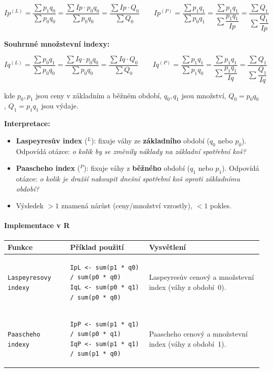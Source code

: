 \documentclass[a4paper, 11pt]{article}
\newenvironment{funkcedict}
{%
  \begingroup
  \renewcommand{\arraystretch}{1.4}%
  \lstset{basicstyle=\ttfamily\small, columns=fullflexible}%
  \setlength{\tabcolsep}{4pt}%
  \begin{tabular}{p{0.19\textwidth} p{0.38\textwidth} p{0.30\textwidth}}
  \textbf{Funkce} & \textbf{Příklad použití} & \textbf{Vysvětlení} \\
  \midrule
}
{%
  \end{tabular}%
  \endgroup
}
\begin{document}
\begin{equation*}
	Ip^{(L)} = \frac{\sum p_1 q_0}{\sum p_0 q_0}
	= \frac{\sum Ip \cdot p_0 q_0}{\sum p_0 q_0}
	= \frac{\sum Ip \cdot Q_0}{\sum Q_0}
	\qquad
	Ip^{(P)} = \frac{\sum p_1 q_1}{\sum p_0 q_1}
	= \frac{\sum p_1 q_1}{\sum \dfrac{p_1 q_1}{Ip}}
	= \frac{\sum Q_1}{\sum \dfrac{Q_1}{Ip}}
\end{equation*}

\medskip
\noindent\textbf{Souhrnné množstevní indexy:}

\begin{equation*}
	Iq^{(L)} = \frac{\sum p_0 q_1}{\sum p_0 q_0}
	= \frac{\sum Iq \cdot p_0 q_0}{\sum p_0 q_0}
	= \frac{\sum Iq \cdot Q_0}{\sum Q_0}
	\qquad
	Iq^{(P)} = \frac{\sum p_1 q_1}{\sum p_1 q_0}
	= \frac{\sum p_1 q_1}{\sum \dfrac{p_1 q_1}{Iq}}
	= \frac{\sum Q_1}{\sum \dfrac{Q_1}{Iq}}
\end{equation*}

kde $p_0, p_1$ jsou ceny v základním a běžném období, $q_0, q_1$ jsou množství,
$Q_0 = p_0 q_0$, $Q_1 = p_1 q_1$ jsou výdaje.

\medskip
\noindent\textbf{Interpretace:}
\begin{itemize}[noitemsep]
	\item \textbf{Laspeyresův index} (${}^L$): fixuje váhy ze \textbf{základního} období ($q_0$ nebo $p_0$). Odpovídá otázce: \emph{o kolik by se změnily náklady na základní spotřební koš?}
	\item \textbf{Paascheho index} (${}^P$): fixuje váhy z \textbf{běžného} období ($q_1$ nebo $p_1$). Odpovídá otázce: \emph{o kolik je dražší nakoupit dnešní spotřební koš oproti základnímu období?}
	\item Výsledek $> 1$ znamená nárůst (ceny/množství vzrostly), $< 1$ pokles.
\end{itemize}

\paragraph{Implementace v R}\mbox{}\par

\begin{funkcedict}
	\texttt{Laspeyresovy indexy} &
	\begin{lstlisting}
IpL <- sum(p1 * q0) / sum(p0 * q0)
IqL <- sum(p0 * q1) / sum(p0 * q0)
	\end{lstlisting}
	& Laspeyresův cenový a množstevní index (váhy z období~0). \\
	\texttt{Paascheho indexy} &
	\begin{lstlisting}
IpP <- sum(p1 * q1) / sum(p0 * q1)
IqP <- sum(p1 * q1) / sum(p1 * q0)
	\end{lstlisting}
	& Paascheho cenový a množstevní index (váhy z období~1). \\
\end{funkcedict}
\end{document}
